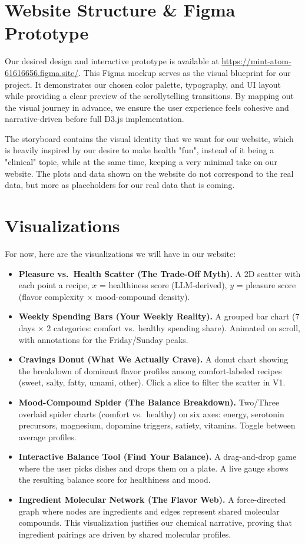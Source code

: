 \documentclass[10pt,conference,compsocconf]{IEEEtran}
\begin{document}
\section{Website Structure \& Figma Prototype}

Our desired design and interactive prototype is available at \url{https://mint-atom-61616656.figma.site/}. This Figma mockup serves as the visual blueprint for our project. It demonstrates our chosen color palette, typography, and UI layout while providing a clear preview of the scrollytelling transitions. By mapping out the visual journey in advance, we ensure the user experience feels cohesive and narrative-driven before full D3.js implementation. 

The storyboard contains the visual identity that we want for our website, which is heavily inspired by our desire to make health "fun", instead of it being a "clinical" topic, while at the same time, keeping a very minimal take on our website. The plots and data shown on the website do not correspond to the real data, but more as placeholders for our real data that is coming.


\section{Visualizations}

For now, here are the visualizations we will have in our website:

\begin{itemize}
    \item \textbf{Pleasure vs.\ Health Scatter (The Trade-Off Myth).} A 2D scatter with each point a recipe, $x$ = healthiness score (LLM-derived), $y$ = pleasure score (flavor complexity $\times$ mood-compound density).
    \item \textbf{Weekly Spending Bars (Your Weekly Reality).} A grouped bar chart (7 days $\times$ 2 categories: comfort vs.\ healthy spending share). Animated on scroll, with annotations for the Friday/Sunday peaks.
    \item \textbf{Cravings Donut (What We Actually Crave).} A donut chart showing the breakdown of dominant flavor profiles among comfort-labeled recipes (sweet, salty, fatty, umami, other). Click a slice to filter the scatter in V1.
    \item \textbf{Mood-Compound Spider (The Balance Breakdown).} Two/Three overlaid spider charts (comfort vs.\ healthy) on six axes: energy, serotonin precursors, magnesium, dopamine triggers, satiety, vitamins. Toggle between average profiles.
    \item \textbf{Interactive Balance Tool (Find Your Balance).} A drag-and-drop game where the user picks dishes and drops them on a plate. A live gauge shows the resulting balance score for healthiness and mood.
    \item \textbf{Ingredient Molecular Network (The Flavor Web).} A force-directed graph where nodes are ingredients and edges represent shared molecular compounds. This visualization justifies our chemical narrative, proving that ingredient pairings are driven by shared molecular profiles.
\end{itemize}
\end{document}
